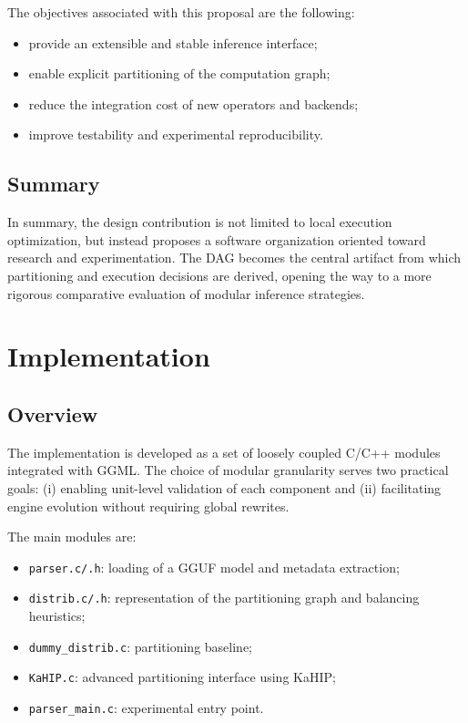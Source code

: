 \documentclass[11pt,a4paper]{article}
\begin{document}
The objectives associated with this proposal are the following:

\begin{itemize}[leftmargin=*]
	\item provide an extensible and stable inference interface;
	\item enable explicit partitioning of the computation graph;
	\item reduce the integration cost of new operators and backends;
	\item improve testability and experimental reproducibility.
\end{itemize}

\subsection{Summary}

In summary, the design contribution is not limited to local execution optimization, but instead proposes a software organization oriented toward research and experimentation. The DAG becomes the central artifact from which partitioning and execution decisions are derived, opening the way to a more rigorous comparative evaluation of modular inference strategies.

\section{Implementation}

\subsection{Overview}

The implementation is developed as a set of loosely coupled C/C++ modules integrated with GGML. The choice of modular granularity serves two practical goals: (i) enabling unit-level validation of each component and (ii) facilitating engine evolution without requiring global rewrites.

The main modules are:
\begin{itemize}[leftmargin=*]
	\item \texttt{parser.c/.h}: loading of a GGUF model and metadata extraction;
	\item \texttt{distrib.c/.h}: representation of the partitioning graph and balancing heuristics;
	\item \texttt{dummy\_distrib.c}: partitioning baseline;
	\item \texttt{KaHIP.c}: advanced partitioning interface using KaHIP;
	\item \texttt{parser\_main.c}: experimental entry point.
\end{itemize}
\end{document}
